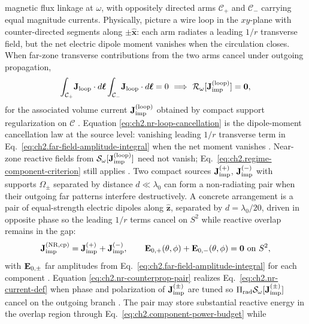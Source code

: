 magnetic flux linkage at \(\omega\), with oppositely directed arms \(\mathcal{C}_+\) and
\(\mathcal{C}_-\) carrying equal magnitude currents. Physically, picture a wire loop in the
\(xy\)-plane with counter-directed segments along \(\pm\hat{\mathbf{x}}\): each arm radiates a
leading \(1/r\) transverse field, but the net electric dipole moment vanishes when the
circulation closes. When far-zone transverse contributions from the two arms cancel under
outgoing propagation,
\begin{equation}
\label{eq:ch2.nr-loop-cancellation}
\int_{\mathcal{C}_+}\!\mathbf{J}_{\mathrm{loop}}\cdot d\boldsymbol{\ell}
\int_{\mathcal{C}_-}\!\mathbf{J}_{\mathrm{loop}}\cdot d\boldsymbol{\ell}
=0
\ \Longrightarrow\
\mathcal{R}_\omega[\mathbf{J}_{\mathrm{imp}}^{(\mathrm{loop})}]=\mathbf{0},
\end{equation}
for the associated volume current \(\mathbf{J}_{\mathrm{imp}}^{(\mathrm{loop})}\) obtained by compact support
regularization on \(\mathcal{C}\) \cite{stratton1941}. Equation
\eqref{eq:ch2.nr-loop-cancellation} is the dipole-moment cancellation law at the source level:
vanishing leading \(1/r\) transverse term in
Eq.~\eqref{eq:ch2.far-field-amplitude-integral} when the net moment vanishes
\cite{jackson1999}. Near-zone reactive fields from \(\mathcal{S}_\omega[\mathbf{J}_{\mathrm{imp}}^{(\mathrm{loop})}]\)
need not vanish; Eq.~\eqref{eq:ch2.regime-component-criterion} still applies \cite{stratton1941}.
Two compact sources \(\mathbf{J}_{\mathrm{imp}}^{(+)}\), \(\mathbf{J}_{\mathrm{imp}}^{(-)}\) with supports \(\Omega_\pm\) separated by
distance \(d\ll\lambda_0\) can form a non-radiating pair when their outgoing far patterns
interfere destructively. A concrete arrangement is a pair of equal-strength electric dipoles
along \(\hat{\mathbf{z}}\), separated by \(d=\lambda_0/20\), driven in opposite phase so the
leading \(1/r\) terms cancel on \(S^{2}\) while reactive overlap remains in the gap:
\begin{equation}
\label{eq:ch2.nr-counterprop-pair}
\mathbf{J}_{\mathrm{imp}}^{\mathrm{(NR,cp)}}=\mathbf{J}_{\mathrm{imp}}^{(+)}+\mathbf{J}_{\mathrm{imp}}^{(-)},
\qquad
\mathbf{E}_{0,+}(\theta,\phi)+\mathbf{E}_{0,-}(\theta,\phi)=\mathbf{0}
\ \text{on}\ S^{2},
\end{equation}
with \(\mathbf{E}_{0,\pm}\) far amplitudes from Eq.~\eqref{eq:ch2.far-field-amplitude-integral} for
each component \cite{stratton1941}. Equation
\eqref{eq:ch2.nr-counterprop-pair} realizes Eq.~\eqref{eq:ch2.nr-current-def} when phase and
polarization of \(\mathbf{J}_{\mathrm{imp}}^{(\pm)}\) are tuned so \(\Pi_{\mathrm{rad}}\mathcal{S}_\omega[\mathbf{J}_{\mathrm{imp}}^{(\pm)}]\)
cancel on the outgoing branch \cite{stratton1941}. The pair may store substantial reactive
energy in the overlap region through Eq.~\eqref{eq:ch2.component-power-budget} while
